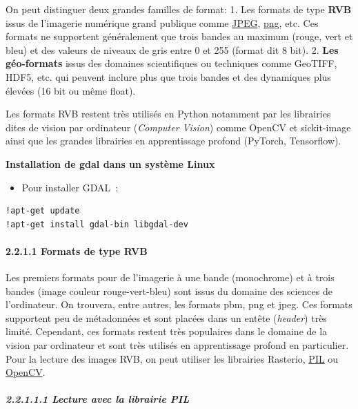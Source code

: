On peut distinguer deux grandes familles de format: 1. Les formats de
type \textbf{RVB} issus de l'imagerie numérique grand publique comme
\href{https://gdal.org/en/latest/drivers/raster/jpeg.html\#raster-jpeg}{JPEG},
\href{https://gdal.org/en/latest/drivers/raster/png.html\#raster-png}{png},
etc. Ces formats ne supportent généralement que trois bandes au maximum
(rouge, vert et bleu) et des valeurs de niveaux de gris entre 0 et 255
(format dit 8 bit). 2. \textbf{Les géo-formats} issus des domaines
scientifiques ou techniques comme GeoTIFF, HDF5, etc. qui peuvent
inclure plus que trois bandes et des dynamiques plus élevées (16 bit ou
même float).

Les formats RVB restent très utilisés en Python notamment par les
librairies dites de vision par ordinateur (\emph{Computer Vision}) comme
OpenCV et sickit-image ainsi que les grandes librairies en apprentissage
profond (PyTorch, Tensorflow).

\textbf{Installation de gdal dans un système Linux}

\begin{itemize}
\tightlist
\item
  Pour installer GDAL~:
\end{itemize}

\begin{verbatim}
!apt-get update
!apt-get install gdal-bin libgdal-dev
\end{verbatim}

\paragraph{\texorpdfstring{{2.2.1.1} Formats de type
RVB}{2.2.1.1 Formats de type RVB}}\label{formats-de-type-rvb}

Les premiers formats pour de l'imagerie à une bande (monochrome) et à
trois bandes (image couleur rouge-vert-bleu) sont issus du domaine des
sciences de l'ordinateur. On trouvera, entre autres, les formats pbm,
png et jpeg. Ces formats supportent peu de métadonnées et sont placées
dans un entête (\emph{header}) très limité. Cependant, ces formats
restent très populaires dans le domaine de la vision par ordinateur et
sont très utilisés en apprentissage profond en particulier. Pour la
lecture des images RVB, on peut utiliser les librairies Rasterio,
\href{https://he-arc.github.io/livre-python/pillow/index.html}{PIL} ou
\href{https://docs.opencv.org/4.10.0/index.html}{OpenCV}.

\subparagraph{\texorpdfstring{{2.2.1.1.1} Lecture avec la librairie
PIL}{2.2.1.1.1 Lecture avec la librairie PIL}}\label{lecture-avec-la-librairie-pil}

